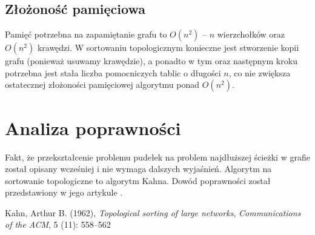 \documentclass{article}
\begin{document}
\subsection{Złożoność pamięciowa}
Pamięć potrzebna na zapamiętanie grafu to $O(n^2)$ -- $n$ wierzchołków oraz $O(n^2)$ krawędzi. W sortowaniu topologicznym konieczne jest stworzenie kopii grafu (ponieważ usuwamy krawędzie), a ponadto w tym oraz następnym kroku potrzebna jest stała liczba pomocniczych tablic o długości $n$, co nie zwiększa ostatecznej złożoności pamięciowej algorytmu ponad $O(n^2)$.
\section{Analiza poprawności}
Fakt, że przekształcenie problemu pudełek na problem najdłuższej ścieżki w grafie został opisany wcześniej i nie wymaga dalszych wyjaśnień. Algorytm na sortowanie topologiczne to algorytm Kahna. Dowód poprawności został przedstawiony w jego artykule \cite{Kahn}. 



\begin{thebibliography}{20}
Kahn, Arthur B. (1962), \textit{Topological sorting of large networks}, \textit{Communications of the ACM}, 5 (11): 558–562
\end{thebibliography}
\end{document}
